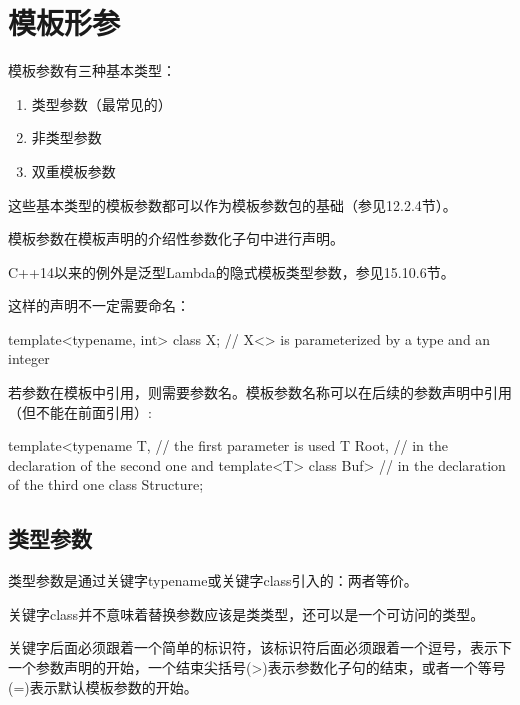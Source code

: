 \section{模板形参}

模板参数有三种基本类型：

\begin{enumerate}
\item 
类型参数（最常见的）

\item 
非类型参数

\item 
双重模板参数
\end{enumerate}	

这些基本类型的模板参数都可以作为模板参数包的基础（参见12.2.4节）。

模板参数在模板声明的介绍性参数化子句中进行声明。

\begin{notice}
C++14以来的例外是泛型Lambda的隐式模板类型参数，参见15.10.6节。
\end{notice}

这样的声明不一定需要命名：

\begin{cpp}
template<typename, int>
class X; // X<> is parameterized by a type and an integer
\end{cpp}

若参数在模板中引用，则需要参数名。模板参数名称可以在后续的参数声明中引用（但不能在前面引用）:

\begin{cpp}
template<typename T, // the first parameter is used
		T Root, // in the declaration of the second one and
		template<T> class Buf> // in the declaration of the third one
class Structure;
\end{cpp}

\subsection{类型参数}

类型参数是通过关键字typename或关键字class引入的：两者等价。

\begin{notice}
关键字class并不意味着替换参数应该是类类型，还可以是一个可访问的类型。
\end{notice}

关键字后面必须跟着一个简单的标识符，该标识符后面必须跟着一个逗号，表示下一个参数声明的开始，一个结束尖括号(>)表示参数化子句的结束，或者一个等号(=)表示默认模板参数的开始。

